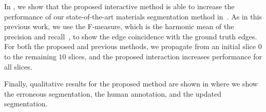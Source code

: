 \documentclass[]{spie}  %
\begin{document}
\begin{figure}[htbp]
\centering
{}

\hspace{0.1em}
\caption{} \label{fig:perform}
\end{figure}

In , we show that the proposed interactive method is able
to increase the performance of our state-of-the-art materials
segmentation method in~\cite{waggoner:11}.  As in this previous work,
we use the F-measure, which is the harmonic mean of the precision and
recall~\cite{martin:01}, to show the edge coincidence with the ground
truth edges.  For both the proposed and previous methods, we propagate
from an initial slice $0$ to the remaining $10$ slices, and the
proposed interaction increases performance for all slices.

Finally, qualitative results for the proposed method are shown in
 where we show the erroneous segmentation, the human
annotation, and the updated segmentation.
\end{document}
